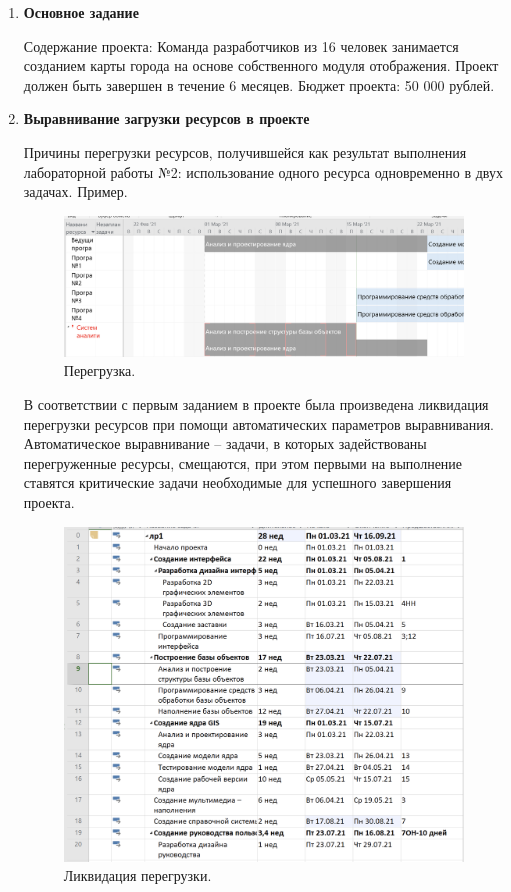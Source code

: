 \documentclass[a4paper,14pt]{extreport} %
\begin{document}
\begin{enumerate}

\item \textbf{Основное задание}

Содержание проекта: Команда разработчиков из 16 человек занимается созданием карты города на основе собственного модуля отображения. Проект должен быть завершен в течение 6 месяцев. Бюджет проекта: 50 000 рублей.

\item \textbf{Выравнивание загрузки ресурсов в проекте}

Причины перегрузки ресурсов, получившейся как результат выполнения лабораторной работы №2: использование одного ресурса одновременно в двух задачах. Пример.

\begin{figure}[H]
  \centering
  \caption{Перегрузка. }
  \includegraphics[scale=0.5]{1}
\end{figure}

В соответствии с первым заданием в проекте была произведена ликвидация перегрузки ресурсов при помощи автоматических параметров выравнивания. Автоматическое выравнивание -- задачи, в которых задействованы перегруженные ресурсы, смещаются, при этом первыми на выполнение ставятся критические задачи необходимые для успешного завершения проекта.

\begin{figure}[H]
  \centering
  \caption{Ликвидация перегрузки. }
  \includegraphics[scale=0.5]{2}
\end{figure}


\end{enumerate}
\end{document}
